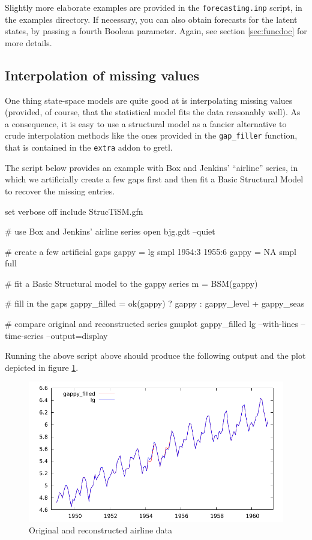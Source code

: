 \documentclass[a4paper,10pt]{article}
\begin{document}
Slightly more elaborate examples are provided in the
\texttt{forecasting.inp} script, in the examples directory. If
necessary, you can also obtain forecasts for the latent states, by
passing a fourth Boolean parameter. Again, see section \ref{sec:funcdoc} for
more details.

\subsection{Interpolation of missing values}
\label{sec:gapfill}

One thing state-space models are quite good at is interpolating
missing values (provided, of course, that the statistical model fits
the data reasonably well). As a consequence, it is easy to use a
structural model as a fancier alternative to crude interpolation
methods like the ones provided in the \verb|gap_filler| function, that
is contained in the \texttt{extra} addon to gretl.

The script below provides an example with Box and Jenkins' ``airline''
series, in which we artificially create a few gaps first and then fit
a Basic Structural Model to recover the missing entries.

\begin{code}
set verbose off
include StrucTiSM.gfn

# use Box and Jenkins' airline series
open bjg.gdt --quiet

# create a few artificial gaps
gappy = lg
smpl 1954:3 1955:6
gappy = NA
smpl full

# fit a Basic Structural model to the gappy series
m = BSM(gappy)

# fill in the gaps
gappy_filled = ok(gappy) ? gappy : gappy_level + gappy_seas

# compare original and reconstructed series
gnuplot gappy_filled lg --with-lines --time-series --output=display  
\end{code}

Running the above script above should produce the following output and
the plot depicted in figure \ref{fig:gappy}.

\pagebreak[4]

\begin{figure}[htbp]
  \centering
  \includegraphics[scale=0.8]{gappy}
  \caption{Original and reconstructed airline data}
  \label{fig:gappy}
\end{figure}
\end{document}
